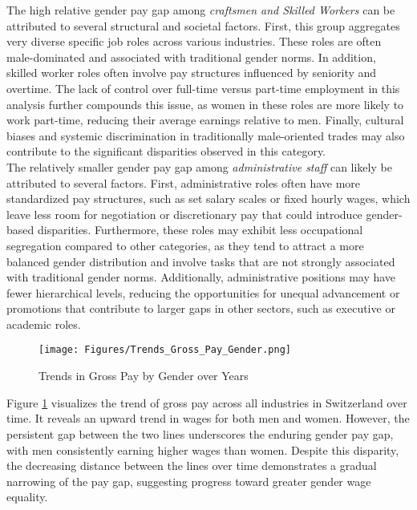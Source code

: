 \documentclass{article}
\begin{document}
The high relative gender pay gap among \textit{craftsmen and Skilled Workers} can be attributed to several structural and societal factors. First, this group aggregates very diverse specific job roles across various industries. These roles are often male-dominated and associated with traditional gender norms. In addition, skilled worker roles often involve pay structures influenced by seniority and overtime. The lack of control over full-time versus part-time employment in this analysis further compounds this issue, as women in these roles are more likely to work part-time, reducing their average earnings relative to men. Finally, cultural biases and systemic discrimination in traditionally male-oriented trades may also contribute to the significant disparities observed in this category.\\

The relatively smaller gender pay gap among \textit{administrative staff} can likely be attributed to several factors. First, administrative roles often have more standardized pay structures, such as set salary scales or fixed hourly wages, which leave less room for negotiation or discretionary pay that could introduce gender-based disparities. Furthermore, these roles may exhibit less occupational segregation compared to other categories, as they tend to attract a more balanced gender distribution and involve tasks that are not strongly associated with traditional gender norms. Additionally, administrative positions may have fewer hierarchical levels, reducing the opportunities for unequal advancement or promotions that contribute to larger gaps in other sectors, such as executive or academic roles. \\


\begin{figure}[h]
    \centering
    \texttt{[image: Figures/Trends\_Gross\_Pay\_Gender.png]}
    \caption{Trends in Gross Pay by Gender over Years}
    \label{fig:gross_trend}
\end{figure}

Figure  \ref{fig:gross_trend} visualizes the trend of gross pay across all industries in Switzerland over time. It reveals an upward trend in wages for both men and women. However, the persistent gap between the two lines underscores the enduring gender pay gap, with men consistently earning higher wages than women. Despite this disparity, the decreasing distance between the lines over time demonstrates a gradual narrowing of the pay gap, suggesting progress toward greater gender wage equality.\\
\end{document}
